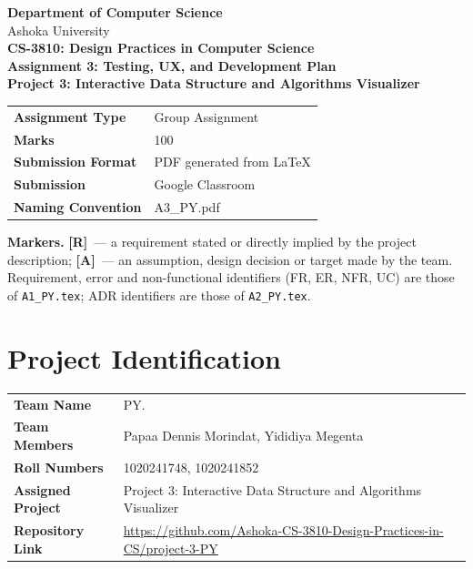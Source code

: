 \documentclass[11pt,a4paper]{article}
\newcommand{\R}{\textcolor{reqc}{\textbf{[R]}}}     %
\newcommand{\A}{\textcolor{asmc}{\textbf{[A]}}}     %
\newcommand{\ct}[1]{\texttt{#1}}
\renewcommand{\arraystretch}{1.06}
\begin{document}
\begin{center}
  {\large\bfseries Department of Computer Science}\\[2pt]
  {\small Ashoka University}\\[10pt]
  {\LARGE\bfseries CS-3810: Design Practices in Computer Science}\\[6pt]
  {\large\bfseries Assignment 3: Testing, UX, and Development Plan}\\[10pt]
  {\large\bfseries Project 3: Interactive Data Structure and Algorithms Visualizer}
\end{center}

\vspace{2pt}
\begin{center}
\renewcommand{\arraystretch}{1.25}
\begin{tabular}{@{}L{4.2cm}L{10.4cm}@{}}
\toprule
\textbf{Assignment Type} & Group Assignment \\
\textbf{Marks} & 100 \\
\textbf{Submission Format} & PDF generated from \LaTeX \\
\textbf{Submission} & Google Classroom \\
\textbf{Naming Convention} & A3\_PY.pdf \\
\bottomrule
\end{tabular}
\end{center}

\noindent\textbf{Markers.} \R\ --- a requirement stated or directly implied by the project
description; \A\ --- an assumption, design decision or target made by the team. Requirement,
error and non-functional identifiers (FR, ER, NFR, UC) are those of \ct{A1\_PY.tex}; ADR
identifiers are those of \ct{A2\_PY.tex}.

\tableofcontents

\section{Project Identification}

\begin{center}
\renewcommand{\arraystretch}{1.25}
\begin{tabular}{@{}L{4.2cm}L{10.4cm}@{}}
\toprule
\textbf{Team Name} & PY. \\
\textbf{Team Members} & Papaa Dennis Morindat, Yididiya Megenta \\
\textbf{Roll Numbers} & 1020241748, 1020241852 \\
\textbf{Assigned Project} & Project 3: Interactive Data Structure and Algorithms Visualizer \\
\textbf{Repository Link} & \url{https://github.com/Ashoka-CS-3810-Design-Practices-in-CS/project-3-PY} \\
\bottomrule
\end{tabular}
\end{center}
\end{document}
